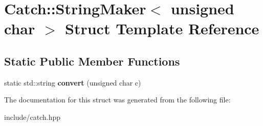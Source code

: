 \hypertarget{structCatch_1_1StringMaker_3_01unsigned_01char_01_4}{}\section{Catch\+:\+:String\+Maker$<$ unsigned char $>$ Struct Template Reference}
\label{structCatch_1_1StringMaker_3_01unsigned_01char_01_4}
\subsection*{Static Public Member Functions}
\begin{DoxyCompactItemize}
\item 
static std\+::string {\bfseries convert} (unsigned char c)\hypertarget{structCatch_1_1StringMaker_3_01unsigned_01char_01_4_a7cddb1df26275b9a8e631466eb122f59}{}\label{structCatch_1_1StringMaker_3_01unsigned_01char_01_4_a7cddb1df26275b9a8e631466eb122f59}

\end{DoxyCompactItemize}


The documentation for this struct was generated from the following file\+:\begin{DoxyCompactItemize}
\item 
include/catch.\+hpp\end{DoxyCompactItemize}
